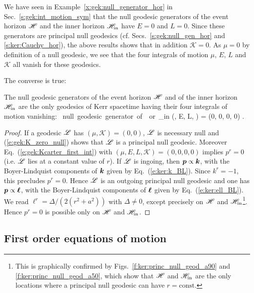\begin{example}
We have seen in Example~\ref{x:gek:null_generator_hor} in Sec.~\ref{s:gek:int_motion_sym}
that the null geodesic generators of the event horizon $\mathscr{H}$ and the
inner horizon $\mathscr{H}_{\rm in}$ have $E=0$ and $L=0$.
Since these generators are principal null geodesics (cf.
Secs.~\ref{s:gek:null_gen_hor} and \ref{s:ker:Cauchy_hor}), the above results shows
that in addition $\mathscr{K}=0$. As $\mu=0$ by definition of a null geodesic,
we see that the four integrals of motion $\mu$, $E$, $L$ and $\mathscr{K}$ all
vanish for these geodesics.
\end{example}
The converse is true:
\begin{greybox}
The null geodesic generators of the event horizon $\mathscr{H}$ and of the
inner horizon $\mathscr{H}_{\rm in}$ are the only geodesics of Kerr spacetime
having their four integrals of motion vanishing:
\be \label{e:gek:all_const_zero}
\Li \ \mbox{null geodesic generator of}\ \Hor\ \mbox{or}\ \Hor_{\rm in} \iff
(\mu, E, L, ) = (0, 0, 0, 0) .
\ee
\end{greybox}
\begin{proof}
If a geodesic $\mathscr{L}$ has $(\mu,\mathscr{K}) = (0,0)$,
$\mathscr{L}$ is necessary null and (\ref{e:gek:K_zero_null}) shows that
$\mathscr{L}$ is a principal null geodesic. Moreover
Eq.~(\ref{e:gek:Kcarter_first_int}) with $(\mu, E, L, \mathscr{K}) = (0, 0, 0, 0)$
implies $p^r = 0$ (i.e. $\mathscr{L}$ lies at a constant value of $r$).
If $\mathscr{L}$ is ingoing, then $\bm{p} \propto \bm{k}$, with the Boyer-Lindquist components
of $\bm{k}$ given by Eq.~(\ref{e:ker:k_BL}). Since $k^r = -1$, this precludes
$p^r = 0$. Hence $\mathscr{L}$ is an outgoing principal null geodesic
and one has $\bm{p} \propto \bm{\ell}$, with the Boyer-Lindquist components
of $\bm{\ell}$ given by Eq.~(\ref{e:ker:ell_BL}). We read $\ell^r = \Delta / (2(r^2+a^2))$
with $\Delta\neq 0$, except precisely on $\mathscr{H}$ and
$\mathscr{H}_{\rm in}$\footnote{This is graphically confirmed by
Figs.~\ref{f:ker:princ_null_geod_a90} and
\ref{f:ker:princ_null_geod_a50}, which show that $\mathscr{H}$ and $\mathscr{H}_{\rm in}$ are the only
locations where a principal null geodesic can have $r=\mathrm{const}$.}. Hence
$p^r = 0$ is possible only on $\mathscr{H}$ and $\mathscr{H}_{\rm in}$.
\end{proof}

\subsection{First order equations of motion} \label{s:gek:first_order_system}

